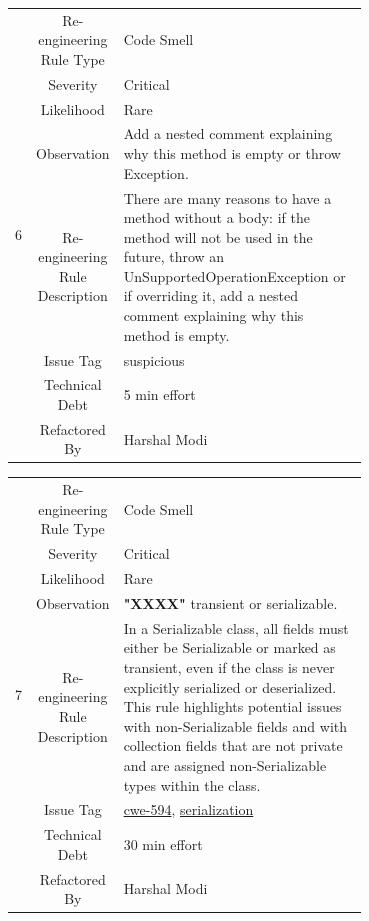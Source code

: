 \documentclass[12pt,letterpaper]{report}
\begin{document}
{\begin{table}
    \begin{tabular}{|c|c|p{0.7\linewidth}|}
    \hline   
    \multirow{8}{*}{6}
        & Re-engineering Rule Type & Code Smell \\
    \cline{2-3}
       & Severity &  Critical \\
    \cline{2-3}
       & Likelihood &  Rare \\
    \cline{2-3}
       & Observation & Add a nested comment explaining why this method is empty or throw Exception. \\
    \cline{2-3}
       & Re-engineering Rule Description &  There are many reasons to have a method without a body: if the method will not be used in the future, throw an UnSupportedOperationException or if overriding it, add a nested comment explaining why this method is empty. \\
    \cline{2-3}
       & Issue Tag & suspicious \\
    \cline{2-3}
       & Technical Debt & 5 min effort  \\
    \cline{2-3}
       & Refactored By & Harshal Modi \\
    \hline
    \end{tabular}
\end{table}

\begin{table}
    \begin{tabular}{|c|c|p{0.7\linewidth}|}
    \hline   
    \multirow{8}{*}{7}
        & Re-engineering Rule Type & Code Smell \\
    \cline{2-3}
       & Severity &  Critical \\
    \cline{2-3}
       & Likelihood &  Rare \\
    \cline{2-3}
       & Observation & \textbf{"XXXX"} transient or serializable. \\
    \cline{2-3}
       & Re-engineering Rule Description &  In a Serializable class, all fields must either be Serializable or marked as transient, even if the class is never explicitly serialized or deserialized. This rule highlights potential issues with non-Serializable fields and with collection fields that are not private and are assigned non-Serializable types within the class. \\
    \cline{2-3}
       & Issue Tag & \href{https://cwe.mitre.org/data/definitions/594}{cwe-594}, \href{https://docs.oracle.com/javase/7/docs/api/java/io/Serializable.html}{serialization} \\
    \cline{2-3}
       & Technical Debt & 30 min effort  \\
    \cline{2-3}
       & Refactored By & Harshal Modi \\
    \hline
    \end{tabular}
\end{table}

}
\end{document}
